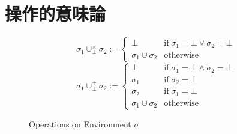 \documentclass[a4j, dvipdfmx]{jsarticle}
\theoremstyle{definition}
\newcommand{\semantics}[1]{[\![ #1 ]\!]}
\begin{document}

\newpage

\section{操作的意味論}

\begin{figure}[H]
  \begin{equation*}
    \sigma_1\cup^\times_\bot\sigma_2 :=
    \begin{cases}
      \bot                 &\text{if}\;\sigma_1=\bot\vee\sigma_2=\bot \\
      \sigma_1\cup\sigma_2 &\text{otherwise}
    \end{cases}
  \end{equation*}
  \begin{equation*}
    \sigma_1\cup^+_\bot\sigma_2 :=
    \begin{cases}
      \bot                 &\text{if}\;\sigma_1=\bot\wedge\sigma_2=\bot \\
      \sigma_1             &\text{if}\;\sigma_2=\bot \\
      \sigma_2             &\text{if}\;\sigma_1=\bot \\
      \sigma_1\cup\sigma_2 &\text{otherwise}
    \end{cases}
  \end{equation*}
  \caption{Operations on Environment $\sigma$}
  \label{fig:op_env}
\end{figure}
\end{document}
